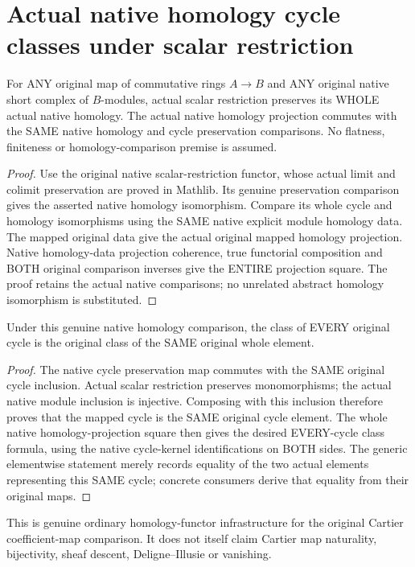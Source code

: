 \section{Actual native homology cycle classes under scalar restriction}
\label{sec:module-homology-scalar-restriction}

\begin{theorem}
\label{lem:actual-module-homology-scalar-restriction}
\leanok
For ANY original map of commutative rings $A\to B$ and ANY original
native short complex of $B$-modules, actual scalar restriction preserves
its WHOLE actual native homology. The actual native homology projection
commutes with the SAME native homology and cycle preservation comparisons.
No flatness, finiteness or homology-comparison premise is assumed.
\end{theorem}
\begin{proof}
Use the original native scalar-restriction functor, whose actual limit
and colimit preservation are proved in Mathlib. Its genuine preservation
comparison gives the asserted native homology isomorphism. Compare its
whole cycle and homology isomorphisms using the SAME native explicit
module homology data. The mapped original data give the actual original
mapped homology projection. Native homology-data projection coherence,
true functorial composition and BOTH original comparison inverses give
the ENTIRE projection square. The proof retains the actual native
comparisons; no unrelated abstract homology isomorphism is substituted.
\end{proof}

\begin{theorem}
\label{lem:actual-module-homology-scalar-restriction-cycles}
\leanok
Under this genuine native homology comparison, the class of EVERY
original cycle is the original class of the SAME original whole element.
\end{theorem}
\begin{proof}
The native cycle preservation map commutes with the SAME original
cycle inclusion. Actual scalar restriction preserves monomorphisms;
the actual native module inclusion is injective. Composing with this
inclusion therefore proves that the mapped cycle is the SAME original
cycle element. The whole native homology-projection square then gives
the desired EVERY-cycle class formula, using the native cycle-kernel
identifications on BOTH sides. The generic elementwise statement merely
records equality of the two actual elements representing this SAME
cycle; concrete consumers derive that equality from their original maps.
\end{proof}

This is genuine ordinary homology-functor infrastructure for the original
Cartier coefficient-map comparison. It does not itself claim Cartier
map naturality, bijectivity, sheaf descent, Deligne--Illusie or vanishing.
